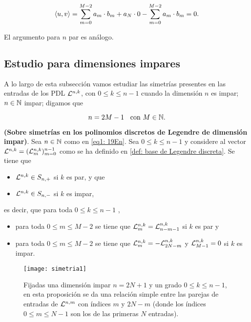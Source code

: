 \[
\langle u, v \rangle = \sum\limits_{m=0}^{M-2}a_{m} \cdot b_{m} + a_{N} \cdot 0
-\sum\limits_{m=0}^{M-2}a_{m} \cdot b_{m} =0.
\]

\noindent
El argumento para $n$ par es análogo.
\QEDB
\vspace{0.2cm}

\subsection{Estudio para dimensiones impares}
A lo largo de esta subsección vamos 
estudiar las simetrías presentes en las entradas
de los PDL $\mathcal{L}^{n,k}$, con $0 \leq k \leq n-1$
cuando la dimensión $n$ es impar;
$n \in \mathbb{N}$ impar; digamos que

\begin{equation}
\label{eq1: 19En}
n=2M - 1 \hspace{0.2cm} \text{ con } M \in \mathbb{N}.
\end{equation}

\begin{teo}
\label{prop: simetrias en dimensiones impares}
\textbf{(Sobre simetrías
en los polinomios discretos de Legendre de dimensión impar)}. 
Sea $n \in \mathbb{N}$ como en \eqref{eq1: 19En}.
Sea $0 \leq k \leq n-1$ y
considere al vector $\mathcal{L}^{n,k}=(\mathcal{L}^{n,k}_{m})_{m=0}^{n-1}$
como se ha definido en \eqref{def: base de Legendre discreta}. 
Se tiene que 
\begin{itemize}
\item $\mathcal{L}^{n,k} \in S_{n,+}$ si $k$ es par, y que
\item $\mathcal{L}^{n,k} \in S_{n,-}$ si $k$ es impar,
\end{itemize}
es decir, que para toda $0 \leq k \leq n-1$ ,
\begin{itemize}
\item para toda $0 \leq m \leq M-2$ se tiene que 
$\mathcal{L}^{n,k}_{m} = \mathcal{L}^{n,k}_{n-m-1}$ si $k$ es par y
\item para toda $0 \leq m \leq M-2$ 
se tiene que $\mathcal{L}^{n,k}_{m} = -\mathcal{L}^{n,k}_{2N-m}$ y 
$\mathcal{L}^{n, k}_{M-1}=0$ si $k$ es impar.
\end{itemize}
\end{teo}
\begin{figure}[H]
\centering\captionsetup{format = hang}
	\begin{measuredfigure}
		\texttt{[image: simetria1]} 
		\caption{
		Fijadas una dimensión impar $n=2N+1$ 
		y un grado $0 \leq k \leq n-1$,
		en esta proposición se da una relación simple entre las parejas 
		de entradas de $\mathcal{L}^{n,m}$ con índices $m$ y $2N-m$ 
		(donde los índices $0 \leq m \leq N-1$ son los de las primeras
		$N$ entradas).}
 	\end{measuredfigure}
 \end{figure}



